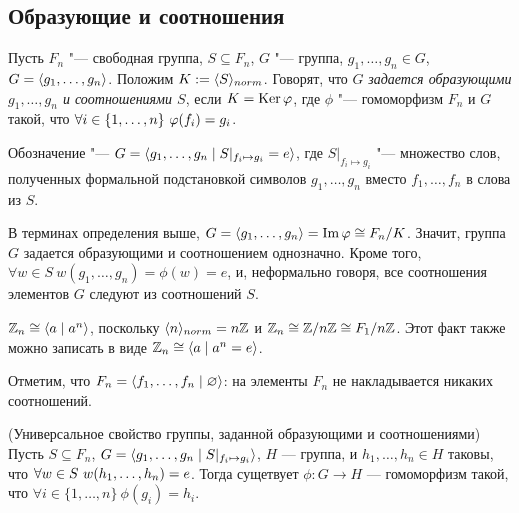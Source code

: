 \subsection{Образующие и соотношения}

\begin{definition}
	Пусть $F_n$ "--- свободная группа, $S \subseteq F_n$, $G$ "--- группа, $g_1, \ldots, g_n \in G$, $G = \langle g_1, \ldots, g_n\rangle$. Положим $K := \langle S\rangle_{norm}$. Говорят, что $G$ \textit{задается образующими $g_1, \ldots, g_n$ и соотношениями $S$}, если $K = \operatorname{Ker}\varphi$, где $\phi$ "--- гомоморфизм $F_n$ и $G$ такой, что $\forall i \hm\in \{1, \ldots, n\}\ \phi(f_i) = g_i$.
	
	Обозначение "--- $G = \langle g_1, \ldots, g_n\mid S|_{f_i \mapsto g_i} = e\rangle$, где $S|_{f_i \mapsto g_i}$ "--- множество слов, полученных формальной подстановкой символов $g_1, \ldots, g_n$ вместо $f_1, \ldots, f_n$ в слова из $S$.
\end{definition}

\begin{note}
	В терминах определения выше, $G = \gl g_1, \ldots, g_n\gr \hm= \im\phi \cong F_n / K$. Значит, группа $G$ задается образующими и соотношением однозначно. Кроме того, $\forall w \in S\ w(g_1, \ldots, g_n) = \phi(w) = e$, и, неформально говоря, все соотношения элементов $G$ следуют из соотношений $S$.
\end{note}

\begin{example}
	$\mathbb{Z}_n \cong \langle a\mid a^n\rangle$, поскольку $\langle n\rangle_{norm} = n\mathbb{Z}$ и $\Z_n \hm\cong \Z/n\Z \hm\cong F_1/n\Z$. Этот факт также можно записать в виде $\mathbb{Z}_n \cong \langle a\mid a^n = e\rangle$.
\end{example}

\begin{note}
	Отметим, что $F_n = \langle f_1, \ldots, f_n\mid \varnothing\rangle$: на элементы $F_n$ не накладывается никаких соотношений.
\end{note}

\begin{theorem} (Универсальное свойство группы, заданной образующими и соотношениями)
	Пусть $S \subseteq F_n$, $G = \langle g_1, \ldots, g_n\mid S|_{f_i \mapsto g_i}\rangle$, $H$ --- группа, и $h_1, \ldots, h_n \in H$ таковы, что $\forall w \in S\ w(h_1, \ldots, h_n) \hm= e$. Тогда сущетвует $\phi \colon G \to H$ --- гомоморфизм такой, что $\forall i \in \{1, \ldots, n\}\ \phi(g_i) = h_i$.
\end{theorem}

